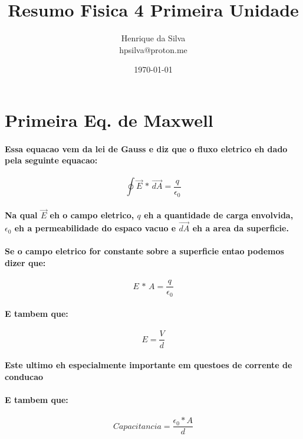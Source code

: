 \documentclass[12pt,twoside, a4paper, twocolumn]{article}
\title{Resumo Fisica 4 Primeira Unidade}
\author{Henrique da Silva \\ hpsilva@proton.me}
\date{\today}
\begin{document}
\maketitle
{}
\newpage
\tableofcontents
\newpage

\newcommand\deriv[2]{\frac{\mathrm d #1}{\mathrm d #2}}

\section{Primeira Eq. de Maxwell}
\paragraph{Essa equacao vem da lei de Gauss e diz que o fluxo eletrico eh dado pela seguinte equacao:
}
\begin{equation}
    \oint \vec{E} \, * \, \vec{dA} = \frac{q}{\epsilon_0}
\end{equation}
\paragraph*{Na qual $\vec{E}$ eh o campo eletrico, $q$ eh a quantidade de carga envolvida, $\epsilon_0$ eh a permeabilidade do espaco vacuo e $\vec{dA}$ eh a area da superficie.}
\paragraph*{Se o campo eletrico for constante sobre a superficie entao podemos dizer que:}
\begin{equation}
    E \, * \, A = \frac{q}{\epsilon_0}
\end{equation}
\paragraph*{E tambem que:}
\begin{equation}
    E = \frac{V}{d}
\end{equation}
\paragraph*{Este ultimo eh especialmente importante em questoes de corrente de conducao}
\paragraph*{E tambem que:}
\begin{equation}
    Capacitancia = \frac{\epsilon_0 * A}{d}
\end{equation}
\end{document}
